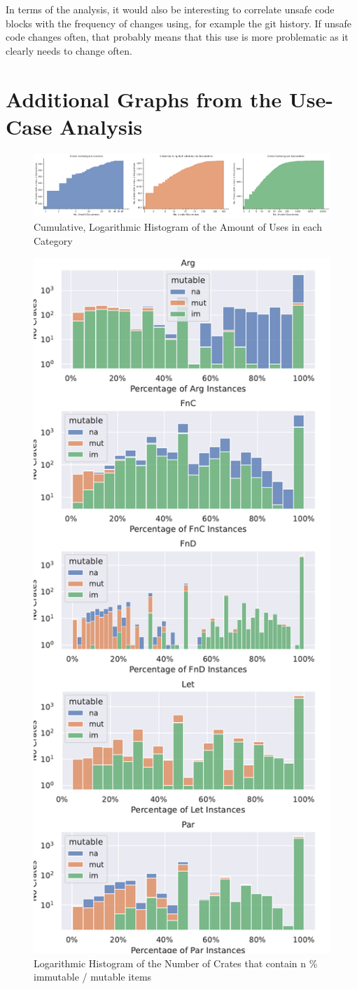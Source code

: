 \documentclass[twoside, english, final]{sdqthesis}
\theoremstyle{definition}
\begin{document}
In terms of the analysis, it would also be interesting to correlate unsafe code blocks with the frequency of changes using, for example the git history. If unsafe code changes often, that probably means that this  use is more problematic as it clearly needs to change often.




\printbibliography[heading=bibintoc]

\newpage
\appendix

\chapter{Additional Graphs from the Use-Case Analysis}
\begin{figure}[h]
	\centering
	\includegraphics[width=0.99\linewidth, clip, trim={0.2cm 0.2cm 0.2cm 0.2cm}]{../unsafe-occurences-vs-no-crates.pdf}
	\caption{Cumulative, Logarithmic Histogram of the Amount of  Uses in each Category}
	\label{fig:unsafe-hist}
\end{figure}


\begin{figure}[h]
	\centering
	\includegraphics[width=0.5\linewidth, clip, trim={0.2cm 0.2cm 0.2cm 0.2cm}]{../hist-mutability.pdf}
	\caption{Logarithmic Histogram of the Number of Crates that contain n \% immutable / mutable items}
	\label{fig:mutability-hist}
\end{figure}
\end{document}
